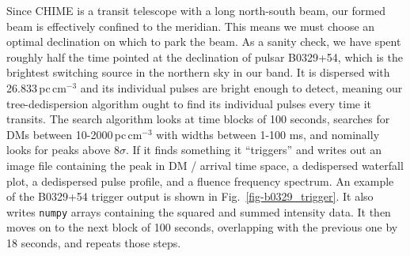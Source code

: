 Since CHIME is a transit telescope with a long north-south beam, 
our formed beam is effectively confined to the meridian. This means
we must choose an optimal declination on which 
to park the beam. As a sanity check, we have spent roughly 
half the time pointed 
at the declination of pulsar B0329+54, which is the 
brightest switching source in the northern sky in our band. It 
is dispersed with 26.833\,pc\,cm$^{-3}$ and its individual 
pulses are bright enough to detect, meaning our tree-dedispersion 
algorithm ought to find its individual pulses every 
time it transits. The search 
algorithm looks at time blocks of 100 seconds, searches 
for DMs between 10-2000\,pc\,cm$^{-3}$ with widths between 
1-100 ms, and nominally looks for peaks above 8$\sigma$. If it finds something
it ``triggers'' and writes out an image file containing the peak 
in DM / arrival time space, a dedispersed waterfall plot, a dedispersed 
pulse profile, and a fluence frequency spectrum. An example 
of the B0329+54 trigger output is shown in Fig.~\ref{fig-b0329_trigger}. 
It also writes {\tt numpy} arrays containing the squared and summed 
intensity data. It then moves on to the next block of 100 seconds, 
overlapping with the previous one by 18 seconds, and repeats 
those steps.


